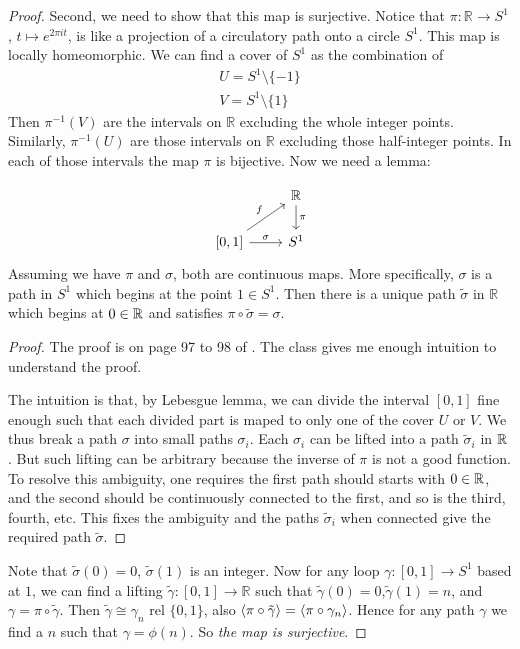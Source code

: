 \begin{proof}
    Second, we need to show that this map is surjective. Notice that
    $\pi:\mathbb{R}\to S^1$, $t\mapsto e^{2\pi i t}$, is like a
    projection of a circulatory path onto a circle $S^1$. This map is
    locally homeomorphic. We can find a cover of $S^1$ as the
    combination of
    \begin{align*}
        U = S^1\setminus \{-1\} \\
        V = S^1\setminus \{1\}
    \end{align*}
    Then $\pi^{-1}(V)$ are the intervals on $\mathbb{R}$ excluding the
    whole integer points. Similarly, $\pi^{-1}(U)$ are those intervals
    on $\mathbb{R}$ excluding those half-integer points. In each of those
    intervals the map $\pi$ is bijective.
    Now we need a lemma:
    \begin{lemma}
        \label{thm:path-lifting-lemma-1}
        \begin{equation}
            \begin{tikzcd}[]
                \, & \mathbb{R}\ar[d,"\pi"] \\
                {[0,1]}\ar[r,"\sigma"]\ar[ru,"f"] & S^1
            \end{tikzcd}
        \end{equation}
        Assuming we have $\pi$ and $\sigma$, both are continuous maps.
        More specifically, $\sigma$ is a path in $S^1$ which begins at the
        point $1\in S^1$. Then there is a unique path $\tilde\sigma$ in
        $\mathbb{R}$ which begins at $0\in \mathbb{R}$ and satisfies $\pi\circ
        \tilde\sigma = \sigma$.
    \end{lemma}
    \begin{proof}
        The proof is on page 97 to 98 of \cite{book}. The class gives
        me enough intuition to understand the proof.

        The intuition is that, by Lebesgue lemma, we can divide the
        interval $[0,1]$ fine enough such that each divided part  is
        maped to only one of the cover $U$ or $V$.  We thus break a
        path $\sigma$ into small paths $\sigma_i$. Each $\sigma_i$ can
        be lifted into a path $\tilde\sigma_i$ in $\mathbb{R}$. But such
        lifting can be arbitrary because the inverse of $\pi$ is not a
        good function. To resolve this ambiguity, one requires the
        first path should starts with $0\in\mathbb{R}$, and the second should
        be continuously connected to the first, and so is the third,
        fourth, etc. This fixes the ambiguity and the paths
        $\tilde\sigma_i$ when connected give the required path
        $\tilde\sigma$.
    \end{proof}
    Note that $\tilde\sigma(0)=0$, $\tilde\sigma(1)$ is an integer.
    Now for any loop $\gamma:[0,1]\to S^1$ based at $1$, we can find a
    lifting $\tilde\gamma:[0,1]\to \mathbb{R}$ such that
    $\tilde\gamma(0)=0$,$\tilde\gamma(1)=n$, and $\gamma = \pi\circ
    \tilde\gamma$. Then $\tilde\gamma \cong \gamma_n$ rel $\{0,1\}$,
    also $\braket{\pi\circ\tilde\gamma}=\braket{\pi\circ\gamma_n}$.
    Hence for any path $\gamma$ we find a $n$ such that
    $\gamma=\phi(n)$. So \textit{the map is surjective}.




\end{proof}
